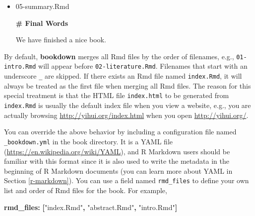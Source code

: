 \documentclass[
  12pt,
]{krantz}
\newenvironment{Shaded}{\begin{snugshade}}{\end{snugshade}}
\newcommand{\AttributeTok}[1]{\textcolor[rgb]{0.13,0.29,0.53}{#1}}
\newcommand{\FunctionTok}[1]{\textcolor[rgb]{0.13,0.29,0.53}{\textbf{#1}}}
\newcommand{\KeywordTok}[1]{\textcolor[rgb]{0.13,0.29,0.53}{\textbf{#1}}}
\newcommand{\NormalTok}[1]{#1}
\newcommand{\StringTok}[1]{\textcolor[rgb]{0.31,0.60,0.02}{#1}}
\theoremstyle{definition}
\theoremstyle{definition}
\theoremstyle{definition}
\theoremstyle{definition}
\theoremstyle{remark}
\begin{document}
\begin{itemize}
\begin{Shaded}
\begin{Highlighting}[]
\FunctionTok{\# Applications}

\NormalTok{Some \_significant\_ applications are demonstrated}
\NormalTok{in this chapter.}

\FunctionTok{\#\# Example one}

\FunctionTok{\#\# Example two}
\end{Highlighting}
\end{Shaded}
\item
  05-summary.Rmd

\begin{Shaded}
\begin{Highlighting}[]
\FunctionTok{\# Final Words}

\NormalTok{We have finished a nice book.}
\end{Highlighting}
\end{Shaded}
\end{itemize}

By default, \textbf{bookdown} merges all Rmd files by the order of filenames, e.g., \texttt{01-intro.Rmd} will appear before \texttt{02-literature.Rmd}. Filenames that start with an underscore \texttt{\_} are skipped. If there exists an Rmd file named \texttt{index.Rmd}, it will always be treated as the first file when merging all Rmd files. The reason for this special treatment is that the HTML file \texttt{index.html} to be generated from \texttt{index.Rmd} is usually the default index file when you view a website, e.g., you are actually browsing \url{http://yihui.org/index.html} when you open \url{http://yihui.org/}.

You can override the above behavior by including a configuration file named \texttt{\_bookdown.yml} in the book directory. It is a YAML file (\url{https://en.wikipedia.org/wiki/YAML}), and R Markdown users should be familiar with this format since it is also used to write the metadata in the beginning of R Markdown documents (you can learn more about YAML in Section \ref{r-markdown}). You can use a field named \texttt{rmd\_files} to define your own list and order of Rmd files for the book. For example,

\begin{Shaded}
\begin{Highlighting}[]
\FunctionTok{rmd\_files}\KeywordTok{:}\AttributeTok{ }\KeywordTok{[}\StringTok{"index.Rmd"}\KeywordTok{,}\AttributeTok{ }\StringTok{"abstract.Rmd"}\KeywordTok{,}\AttributeTok{ }\StringTok{"intro.Rmd"}\KeywordTok{]}
\end{Highlighting}
\end{Shaded}
\end{document}
